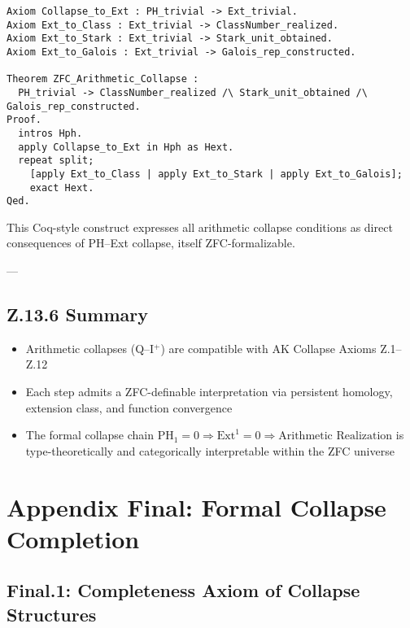 \documentclass[11pt]{article}
\begin{document}
\begin{axiom}
\begin{axiom}
{{\begin{verbatim}
Axiom Collapse_to_Ext : PH_trivial -> Ext_trivial.
Axiom Ext_to_Class : Ext_trivial -> ClassNumber_realized.
Axiom Ext_to_Stark : Ext_trivial -> Stark_unit_obtained.
Axiom Ext_to_Galois : Ext_trivial -> Galois_rep_constructed.

Theorem ZFC_Arithmetic_Collapse :
  PH_trivial -> ClassNumber_realized /\ Stark_unit_obtained /\ Galois_rep_constructed.
Proof.
  intros Hph.
  apply Collapse_to_Ext in Hph as Hext.
  repeat split;
    [apply Ext_to_Class | apply Ext_to_Stark | apply Ext_to_Galois];
    exact Hext.
Qed.
\end{verbatim}

This Coq-style construct expresses all arithmetic collapse conditions as direct consequences of PH–Ext collapse, itself ZFC-formalizable.

---

\subsection*{Z.13.6 Summary}

\begin{itemize}
  \item Arithmetic collapses (Q–I$^+$) are compatible with AK Collapse Axioms Z.1–Z.12
  \item Each step admits a ZFC-definable interpretation via persistent homology, extension class, and function convergence
  \item The formal collapse chain \( \mathrm{PH}_1 = 0 \Rightarrow \mathrm{Ext}^1 = 0 \Rightarrow \text{Arithmetic Realization} \)  
        is type-theoretically and categorically interpretable within the ZFC universe
\end{itemize}

\begin{center}
\end{center}




\section*{Appendix Final: Formal Collapse Completion}

\subsection*{Final.1: Completeness Axiom of Collapse Structures}

}}
\end{axiom}
\end{axiom}
\end{document}
